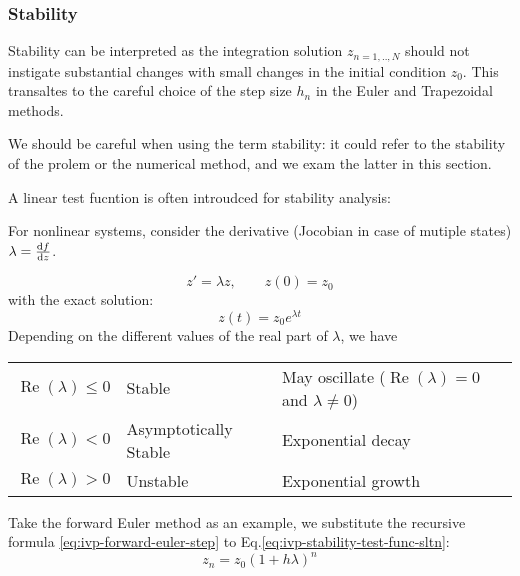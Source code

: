 \documentclass[letterpaper, 11pt]{article}
\providecommand{\diff}[2]{\ensuremath{\frac{{\rm d} #1}{{\rm d} #2}}}
\begin{document}
\subsubsection{Stability}
\label{sec-1-2-1}
Stability can be interpreted as the integration solution $z_{n=1,..,N}$ should not instigate substantial changes with small changes in the initial condition $z_{0}$. This
transaltes to the careful choice of the step size $h_{n}$ in the Euler and Trapezoidal methods.
\begin{margintable}
\footnotesize
We should be careful when using the term stability: it could refer to the stability of the prolem or the numerical method, and we exam the latter in this section. 
\end{margintable}
A linear test fucntion is often introudced for stability analysis: 
\begin{margintable}
\footnotesize
For nonlinear systems, consider the derivative (Jocobian in case of mutiple states) $\lambda = \diff{f}{z}$. 
\end{margintable}
\begin{equation}
\label{eq:ivp-stability-test-func}
z'=\lambda z,\qquad z(0) = z_{0}
\end{equation}
with the exact solution:
\begin{equation}
\label{eq:ivp-stability-test-func-sltn}
z(t) = z_{0}e^{\lambda t}
\end{equation}
Depending on the different values of the real part of $\lambda$, we have
\begin{margintable}
\footnotesize
More rigourous definition on stability is given in Chapter 2 of Ascher and Petzold~\cite{M.Ascher1998b}}
\end{margintable}
\begin{center}
\begin{tabular}{lll}
\hline
$\operatorname{Re}(\lambda) \leq 0$ & Stable & May oscillate ($\operatorname{Re}(\lambda) = 0$ and $\lambda \not = 0$)\\
$\operatorname{Re}(\lambda) < 0$ & Asymptotically Stable & Exponential decay\\
$\operatorname{Re}(\lambda) > 0$ & Unstable & Exponential growth\\
\hline
\end{tabular}
\end{center}
Take the forward Euler method as an example, we substitute the recursive formula \eqref{eq:ivp-forward-euler-step} to Eq.\eqref{eq:ivp-stability-test-func-sltn}:
\begin{equation}
\label{eq:ivp-forward-euler-stability}
z_{n} = z_{0}(1 + h\lambda)^{n}
\end{equation}
\end{document}
